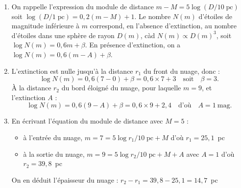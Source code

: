 \documentclass[a4paper,10pt]{report}
\renewcommand{\u}[1]{\ensuremath{\mathrm{#1}}} %
\begin{document}
\begin{Answer}
  \begin{enumerate}
  \item On rappelle l'expression du module de distance $m-M =
    5\log(D/10\;\u{pc})$ soit $\log(D/1\;\u{pc}) = 0,2(m-M)+1$. Le
    nombre $N(m)$ d'étoiles de magnitude inférieure à $m$ correspond,
    en l'absence d'extinction, au nombre d'étoiles dans une sphère de
    rayon $D(m)$, càd $N(m) \propto D(m)^3$, soit $\log N(m) = 0,6 m +
    \beta$.  En présence d'extinction, on a $\log N(m) = 0,6(m-A) +
    \beta$.
  \item L'extinction est nulle jusqu'à la distance $r_1$ du front du
    nuage, donc :
    $$
    \log{N(m)} = 0,6 (7-0) + \beta = 0,6\times 7 + 3
    \quad\text{soit}\quad \beta=3.
    $$
    À la distance $r_2$ du bord éloigné du nuage, pour laquelle $m =
    9$, et l'extinction $A$ :
    $$
    \log{N(m)} = 0,6 (9-A) + \beta = 0,6\times 9 + 2,4
    \quad\text{d'où}\quad A = 1~\u{mag}.
    $$
  \item En écrivant l'équation du module de distance avec $M=5$ :
    \begin{itemize}
    \item à l'entrée du nuage, $m = 7 = 5\log{r_1/10\;\u{pc}}+M$ d'où
      $r_1 = 25,1$~pc
    \item à la sortie du nuage, $m = 9 = 5\log{r_2/10\;\u{pc}}+M+A$
      avec $A=1$ d'où $r_{2} = 39,8$~pc
    \end{itemize}
    On en déduit l'épaisseur du nuage : $r_2-r_1 = 39,8-25,1 = 14,7$~pc
  \end{enumerate}
\end{Answer}
\end{document}
